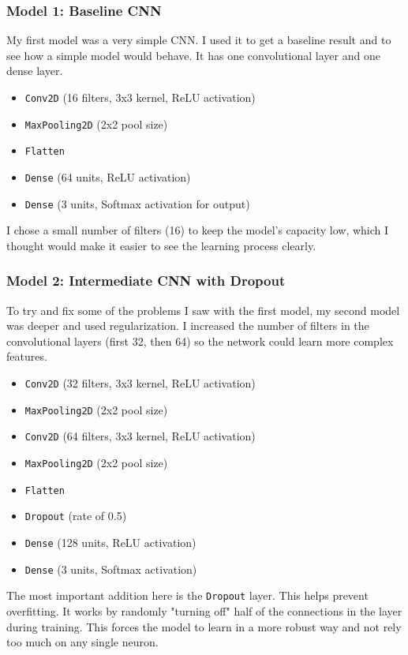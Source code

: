 \documentclass[pdflatex,sn-mathphys-num]{sn-jnl}%
\theoremstyle{thmstyleone}%
\theoremstyle{thmstyletwo}%
\theoremstyle{thmstylethree}%
\begin{document}
\subsubsection{Model 1: Baseline CNN}
My first model was a very simple CNN. I used it to get a baseline result and to see how a simple model would behave. It has one convolutional layer and one dense layer.
\begin{itemize}
    \item \texttt{Conv2D} (16 filters, 3x3 kernel, ReLU activation)
    \item \texttt{MaxPooling2D} (2x2 pool size)
    \item \texttt{Flatten}
    \item \texttt{Dense} (64 units, ReLU activation)
    \item \texttt{Dense} (3 units, Softmax activation for output)
\end{itemize}
I chose a small number of filters (16) to keep the model's capacity low, which I thought would make it easier to see the learning process clearly.

\subsubsection{Model 2: Intermediate CNN with Dropout}
To try and fix some of the problems I saw with the first model, my second model was deeper and used regularization. I increased the number of filters in the convolutional layers (first 32, then 64) so the network could learn more complex features.
\begin{itemize}
    \item \texttt{Conv2D} (32 filters, 3x3 kernel, ReLU activation)
    \item \texttt{MaxPooling2D} (2x2 pool size)
    \item \texttt{Conv2D} (64 filters, 3x3 kernel, ReLU activation)
    \item \texttt{MaxPooling2D} (2x2 pool size)
    \item \texttt{Flatten}
    \item \texttt{Dropout} (rate of 0.5)
    \item \texttt{Dense} (128 units, ReLU activation)
    \item \texttt{Dense} (3 units, Softmax activation)
\end{itemize}
The most important addition here is the \texttt{Dropout} layer. This helps prevent overfitting. It works by randomly "turning off" half of the connections in the layer during training. This forces the model to learn in a more robust way and not rely too much on any single neuron.
\end{document}

